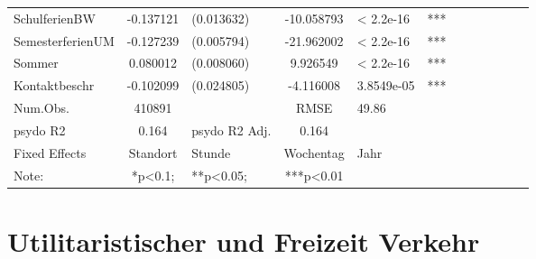 \documentclass[a4paper,12pt]{thesis}
\begin{document}
\begin{table}[!ht]
\begin{tabular}[t]{lc lc lc lc lc lc}
		SchulferienBW & -0.137121 & (0.013632) & -10.058793 & < 2.2e-16 & *** \\
		SemesterferienUM & -0.127239 & (0.005794) & -21.962002 & < 2.2e-16 & *** \\
		Sommer & 0.080012 & (0.008060) & 9.926549 & < 2.2e-16 & *** \\
		Kontaktbeschr & -0.102099 & (0.024805) & -4.116008 & 3.8549e-05 & *** \\
		\midrule
		Num.Obs. & 410891& & RMSE & 49.86 & \\
		psydo R2 & 0.164 & psydo R2 Adj. & 0.164 &  & \\
		\bottomrule
		Fixed Effects & Standort & Stunde & Wochentag & Jahr & \\
		Note: & *p<0.1; & **p<0.05; &***p<0.01 & &\\
	\end{tabular}
\label{reg2}
\end{table}


\section{Utilitaristischer und Freizeit Verkehr}
\end{document}
